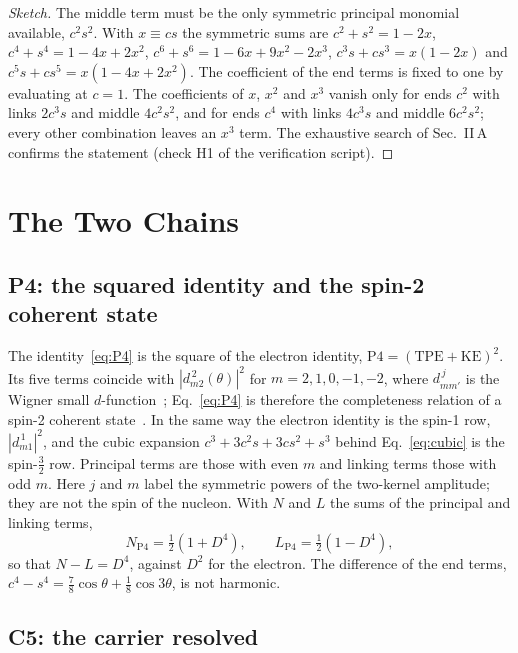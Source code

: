 \documentclass[%
 reprint, amsmath,amssymb, aps, prb, ]{revtex4-2}
\numberwithin{equation}{section}
\begin{document}
\begin{proof}[Sketch]
The middle term must be the only symmetric principal monomial available, $c^2s^2$. With $x\equiv cs$ the symmetric sums are $c^2+s^2=1-2x$, $c^4+s^4=1-4x+2x^2$, $c^6+s^6=1-6x+9x^2-2x^3$, $c^3s+cs^3=x(1-2x)$ and $c^5s+cs^5=x(1-4x+2x^2)$. The coefficient of the end terms is fixed to one by evaluating at $c=1$. The coefficients of $x$, $x^2$ and $x^3$ vanish only for ends $c^2$ with links $2c^3s$ and middle $4c^2s^2$, and for ends $c^4$ with links $4c^3s$ and middle $6c^2s^2$; every other combination leaves an $x^3$ term. The exhaustive search of Sec.~II\,A confirms the statement (check H1 of the verification script).
\end{proof}

\section{The Two Chains}
\label{sec:chains}

\subsection{P4: the squared identity and the spin-2 coherent state}

The identity~\eqref{eq:P4} is the square of the electron identity, $\mathrm{P4}=(\mathrm{TPE}+\mathrm{KE})^2$. Its five terms coincide with $|d^{\,2}_{m2}(\theta)|^2$ for $m=2,1,0,-1,-2$, where $d^{\,j}_{mm'}$ is the Wigner small $d$-function~\cite{ref:sakurai}; Eq.~\eqref{eq:P4} is therefore the completeness relation of a spin-2 coherent state~\cite{ref:radcliffe,ref:acgt}. In the same way the electron identity is the spin-1 row, $|d^{\,1}_{m1}|^2$, and the cubic expansion $c^3+3c^2s+3cs^2+s^3$ behind Eq.~\eqref{eq:cubic} is the spin-$\frac32$ row. Principal terms are those with even $m$ and linking terms those with odd $m$. Here $j$ and $m$ label the symmetric powers of the two-kernel amplitude; they are not the spin of the nucleon. With $N$ and $L$ the sums of the principal and linking terms,
\begin{equation}
N_{\mathrm{P4}}=\tfrac12(1+D^4),\qquad L_{\mathrm{P4}}=\tfrac12(1-D^4),
\label{eq:NLP4}
\end{equation}
so that $N-L=D^4$, against $D^2$ for the electron. The difference of the end terms, $c^4-s^4=\frac78\cos\theta+\frac18\cos3\theta$, is not harmonic.

\subsection{C5: the carrier resolved}
\end{document}
